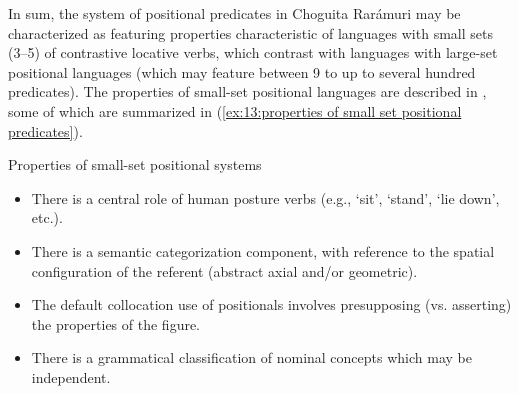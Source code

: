     \label{ex:13:postural predicates as aspect markersa}
        \label{ex:13:postural predicates as aspect markersb}
    \z
\z


In sum, the system of positional predicates in Choguita Rarámuri may be characterized as featuring properties characteristic of languages with small sets (3--5) of contrastive locative verbs, which contrast with languages with large-set positional languages (which may feature between 9 to up to several hundred predicates). The properties of small-set positional languages are described in \citep[][858--9]{ameka2007introduction}, some of which are summarized in (\ref{ex:13:properties of small set positional predicates}).

\ea\label{ex:13:properties of small set positional predicates}
{Properties of small-set positional systems}

    \begin{itemize}
        \item There is a central role of human posture verbs (e.g., `sit', `stand', `lie down', etc.).\\
        \item There is a semantic categorization component, with reference to the spatial configuration of the referent (abstract axial and/or geometric).\\
        \item The default collocation use of positionals involves presupposing (vs. asserting) the properties of the figure.\\
        \item There is a grammatical classification of nominal concepts which may be independent.\\
    \end{itemize}
\z

